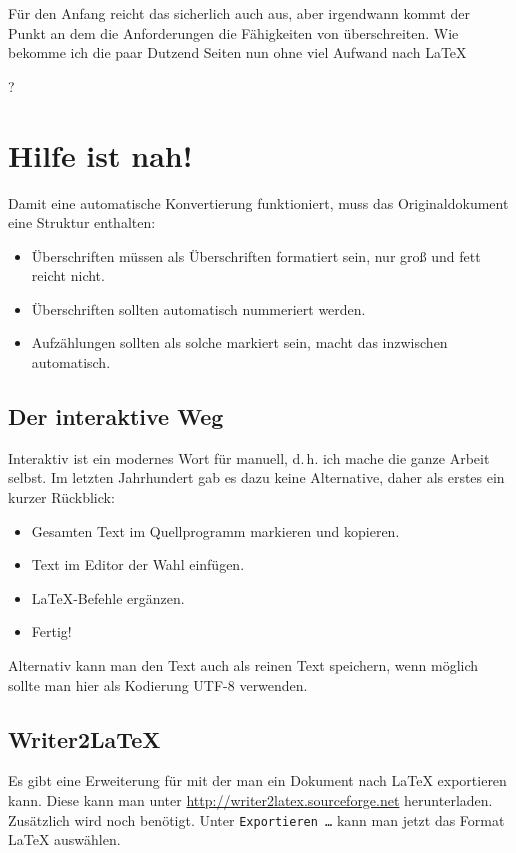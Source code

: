 Für den Anfang reicht das sicherlich auch aus, aber irgendwann kommt der Punkt an dem die Anforderungen die Fähigkeiten von  überschreiten.
Wie bekomme ich die paar Dutzend Seiten nun ohne viel Aufwand nach \LaTeX{{}?

\section{Hilfe ist nah!}

Damit eine automatische Konvertierung funktioniert, muss das Originaldokument eine Struktur enthalten:

\begin{itemize}
\item Überschriften müssen als Überschriften formatiert sein, nur groß und fett reicht nicht.
\item Überschriften sollten automatisch nummeriert werden.
\item Aufzählungen sollten als solche markiert sein,  macht das inzwischen automatisch.
\end{itemize}

\subsection{Der interaktive Weg}

Interaktiv ist ein modernes Wort für manuell, d.\,h. ich mache die ganze Arbeit selbst. 
Im letzten Jahrhundert gab es dazu keine Alternative, daher als erstes ein kurzer Rückblick:

\begin{itemize}
\item Gesamten Text im Quellprogramm markieren und kopieren.
\item Text im Editor der Wahl einfügen.
\item \LaTeX{}-Befehle ergänzen.
\item Fertig!
\end{itemize}

Alternativ kann man den Text auch als reinen Text speichern, wenn möglich sollte man hier als Kodierung UTF-8 verwenden.

\subsection{Writer2LaTeX}

Es gibt eine Erweiterung für  mit der man ein Dokument nach \LaTeX{} exportieren kann.
Diese kann man unter \url{http://writer2latex.sourceforge.net} herunterladen.
Zusätzlich wird noch  benötigt.
Unter \texttt{Exportieren \dots} kann man jetzt das Format \LaTeX{} auswählen.

}
